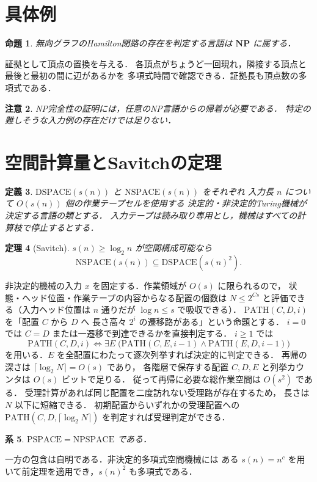 \documentclass[a5paper,10pt,onecolumn]{jsarticle}
\makeatletter
\theoremstyle{mathnotetheorem}
\newtheorem{theorem}{定理}[section]
\newtheorem{definition}[theorem]{定義}
\newtheorem{proposition}[theorem]{命題}
\newtheorem{corollary}[theorem]{系}
\newtheorem{remark}[theorem]{注意}
\renewcommand{\proofname}{証明}
\renewenvironment{proof}[1][\proofname]{%
  \par\pushQED{\qed}\normalfont\topsep4\p@\@plus2\p@\relax
  \trivlist\item[\hskip\labelsep\bfseries #1]\ignorespaces
}{\popQED\endtrivlist\@endpefalse}
\makeatother
\begin{document}
\section{具体例}
\begin{proposition}
無向グラフのHamilton閉路の存在を判定する言語は $\mathbf{NP}$ に属する．
\end{proposition}
\begin{proof}
証拠として頂点の置換を与える．
各頂点がちょうど一回現れ，隣接する頂点と最後と最初の間に辺があるかを
多項式時間で確認できる．証拠長も頂点数の多項式である．
\end{proof}
\begin{remark}
NP完全性の証明には，任意のNP言語からの帰着が必要である．
特定の難しそうな入力例の存在だけでは足りない．
\end{remark}


\section{空間計算量とSavitchの定理}
\begin{definition}
$\mathrm{DSPACE}(s(n))$ と $\mathrm{NSPACE}(s(n))$ をそれぞれ
入力長 $n$ について $O(s(n))$ 個の作業テープセルを使用する
決定的・非決定的Turing機械が決定する言語の類とする．
入力テープは読み取り専用とし，機械はすべての計算枝で停止するとする．
\end{definition}
\begin{theorem}[Savitch]
$s(n)\ge\log_2 n$ が空間構成可能なら
\[
 \mathrm{NSPACE}(s(n))\subseteq\mathrm{DSPACE}(s(n)^2).
\]
\end{theorem}
\begin{proof}
非決定的機械の入力 $x$ を固定する．作業領域が $O(s)$ に限られるので，
状態・ヘッド位置・作業テープの内容からなる配置の個数は
$N\le 2^{Cs}$ と評価できる（入力ヘッド位置は $n$ 通りだが
$\log n\le s$ で吸収できる）．
$\mathrm{PATH}(C,D,i)$ を「配置 $C$ から $D$ へ
長さ高々 $2^i$ の遷移路がある」という命題とする．
$i=0$ では $C=D$ または一遷移で到達できるかを直接判定する．
$i\ge1$ では
\[
 \mathrm{PATH}(C,D,i)\iff
 \exists E\;\bigl(\mathrm{PATH}(C,E,i-1)
 \land\mathrm{PATH}(E,D,i-1)\bigr)
\]
を用いる．$E$ を全配置にわたって逐次列挙すれば決定的に判定できる．
再帰の深さは $\lceil\log_2 N\rceil=O(s)$ であり，
各階層で保存する配置 $C,D,E$ と列挙カウンタは $O(s)$ ビットで足りる．
従って再帰に必要な総作業空間は $O(s^2)$ である．
受理計算があれば同じ配置を二度訪れない受理路が存在するため，
長さは $N$ 以下に短縮できる．
初期配置からいずれかの受理配置への
$\mathrm{PATH}(C,D,\lceil\log_2N\rceil)$ を判定すれば受理判定ができる．
\end{proof}
\begin{corollary}
$\mathrm{PSPACE}=\mathrm{NPSPACE}$ である．
\end{corollary}
\begin{proof}
一方の包含は自明である．非決定的多項式空間機械には
ある $s(n)=n^c$ を用いて前定理を適用でき，$s(n)^2$ も多項式である．
\end{proof}
\end{document}
